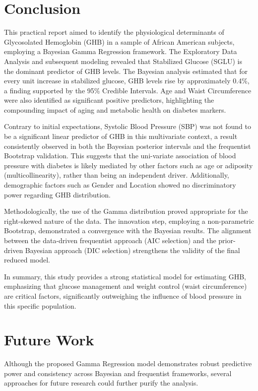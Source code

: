 \section{Conclusion}

This practical report aimed to identify the physiological determinants of Glycosolated Hemoglobin (GHB) in a sample of African American subjects, employing a Bayesian Gamma Regression framework. The Exploratory Data Analysis and subsequent modeling revealed that Stabilized Glucose (SGLU) is the dominant predictor of GHB levels. The Bayesian analysis estimated that for every unit increase in stabilized glucose, GHB levels rise by approximately 0.4\%, a finding supported by the 95\% Credible Intervals. Age and Waist Circumference were also identified as significant positive predictors, highlighting the compounding impact of aging and metabolic health on diabetes markers.

Contrary to initial expectations, Systolic Blood Pressure (SBP) was not found to be a significant linear predictor of GHB in this multivariate context, a result consistently observed in both the Bayesian posterior intervals and the frequentist Bootstrap validation. This suggests that the uni-variate association of blood pressure with diabetes is likely mediated by other factors such as age or adiposity (multicollinearity), rather than being an independent driver. Additionally, demographic factors such as Gender and Location showed no discriminatory power regarding GHB distribution.

Methodologically, the use of the Gamma distribution proved appropriate for the right-skewed nature of the data. The innovation step, employing a non-parametric Bootstrap, demonstrated a convergence with the Bayesian results. The alignment between the data-driven frequentist approach (AIC selection) and the prior-driven Bayesian approach (DIC selection) strengthens the validity of the final reduced model.

In summary, this study provides a strong statistical model for estimating GHB, emphasizing that glucose management and weight control (waist circumference) are critical factors, significantly outweighing the influence of blood pressure in this specific population.


\section{Future Work}

Although the proposed Gamma Regression model demonstrates robust predictive power and consistency across Bayesian and frequentist frameworks, several approaches for future research could further purify the analysis.

